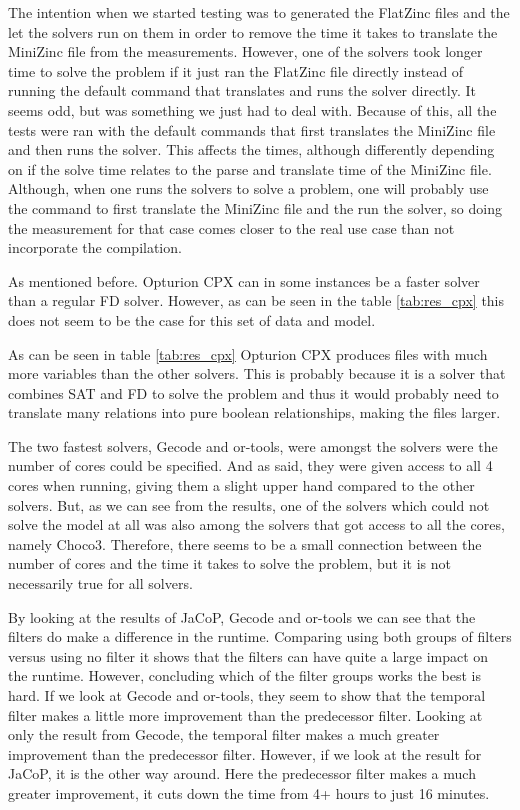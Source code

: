 The intention when we started testing was to generated the FlatZinc files and the let the solvers run on them in order to remove the time it takes to translate the MiniZinc file from the measurements. However, one of the solvers took longer time to solve the problem if it just ran the FlatZinc file directly instead of running the default command that translates and runs the solver directly. It seems odd, but was something we just had to deal with. Because of this, all the tests were ran with the default commands that first translates the MiniZinc file and then runs the solver. This affects the times, although differently depending on if the solve time relates to the parse and translate time of the MiniZinc file. Although, when one runs the solvers to solve a problem, one will probably use the command to first translate the MiniZinc file and the run the solver, so doing the measurement for that case comes closer to the real use case than not incorporate the compilation.

As mentioned before. Opturion CPX can in some instances be a faster solver than a regular FD solver. However, as can be seen in the table \ref{tab:res_cpx} this does not seem to be the case for this set of data and model.

As can be seen in table \ref{tab:res_cpx} Opturion CPX produces files with much more variables than the other solvers. This is probably because it is a solver that combines SAT and FD to solve the problem and thus it would probably need to translate many relations into pure boolean relationships, making the files larger.

The two fastest solvers, Gecode and or-tools, were amongst the solvers were the number of cores could be specified. And as said, they were given access to all 4 cores when running, giving them a slight upper hand compared to the other solvers. But, as we can see from the results, one of the solvers which could not solve the model at all was also among the solvers that got access to all the cores, namely Choco3. Therefore, there seems to be a small connection between the number of cores and the time it takes to solve the problem, but it is not necessarily true for all solvers.

By looking at the results of JaCoP, Gecode and or-tools we can see that the filters do make a difference in the runtime. Comparing using both groups of filters versus using no filter it shows that the filters can have quite a large impact on the runtime. However, concluding which of the filter groups works the best is hard. If we look at Gecode and or-tools, they seem to show that the temporal filter makes a little more improvement than the predecessor filter. Looking at only the result from Gecode, the temporal filter makes a much greater improvement than the predecessor filter. However, if we look at the result for JaCoP, it is the other way around. Here the predecessor filter makes a much greater improvement, it cuts down the time from 4+ hours to just 16 minutes.


